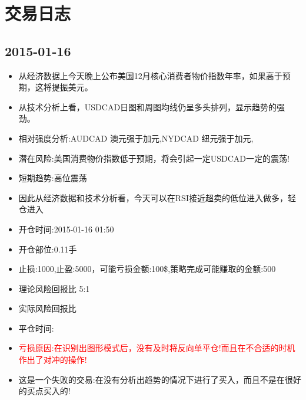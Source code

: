 \section{交易日志}



\subsection{2015-01-16}
\begin{itemize}
\item 从经济数据上今天晚上公布美国12月核心消费者物价指数年率，如果高于预期，这将提振美元。
\item 从技术分析上看，USDCAD日图和周图均线仍呈多头排列，显示趋势的强劲。
\item 相对强度分析:AUDCAD 澳元强于加元,NYDCAD 纽元强于加元,
\item 潜在风险:美国消费物价指数低于预期，将会引起一定USDCAD一定的震荡!
\item 短期趋势:高位震荡
\item 因此从经济数据和技术分析看，今天可以在RSI接近超卖的低位进入做多，轻仓进入
\item 开仓时间:2015-01-16 01:50
\item 开仓部位:0.11手
\item 止损:1000,止盈:5000，可能亏损金额:100\$,策略完成可能赚取的金额:500
\item 理论风险回报比 5:1
\item 实际风险回报比
\item 平仓时间:
\item \textcolor{red}{亏损原因:在识别出图形模式后，没有及时将反向单平仓!而且在不合适的时机作出了对冲的操作!}
\item 这是一个失败的交易:在没有分析出趋势的情况下进行了买入，而且不是在很好的买点买入的!
\end{itemize}
